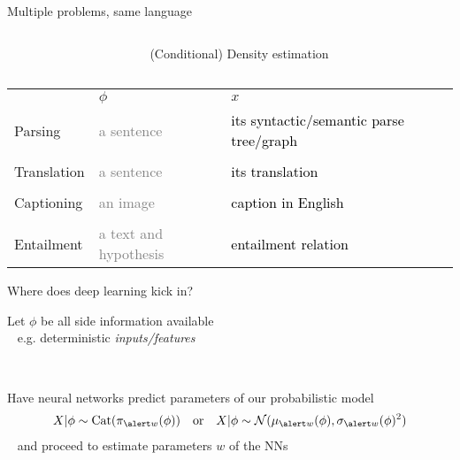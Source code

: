 \documentclass[14pt]{beamer}
\begin{document}
\begin{frame}{Multiple problems, same language}



\begin{small}

\begin{columns}
\begin{column}{0.3\textwidth}
\end{column}
\begin{column}{0.6\textwidth}
\alert{(Conditional) Density estimation}
\end{column}

\end{columns}

\begin{tabular}{p{2cm} p{4cm} p{4cm}}
 & $\phi$ & $x$ \\
Parsing &   \textcolor{gray}{a sentence} & \textcolor{black}{its syntactic/semantic parse tree/graph} \\
&&\\
Translation &  \textcolor{gray}{a sentence} & \textcolor{black}{its translation} \\
&&\\
Captioning &  \textcolor{gray}{an image} & \textcolor{black}{caption in English} \\
&&\\
Entailment  & \textcolor{gray}{a text and hypothesis} & \textcolor{black}{entailment relation}
\end{tabular}
\end{small}

\end{frame}

\begin{frame}{Where does deep learning kick in?}

Let $\phi$ be all side information available\\
~ e.g. deterministic \emph{inputs/features}

~

Have neural networks predict parameters of our probabilistic model
	\begin{align*}
    X|\phi \sim \Cat(\pi_{\alert w}(\phi)) & & \text{or} & & X|\phi \sim \mathcal N(\mu_{\alert w}(\phi), \sigma_{\alert w}(\phi)^2)
    \end{align*}
~ and proceed to \alert{estimate parameters} $w$ of the NNs %

 





\end{frame}
\end{document}
